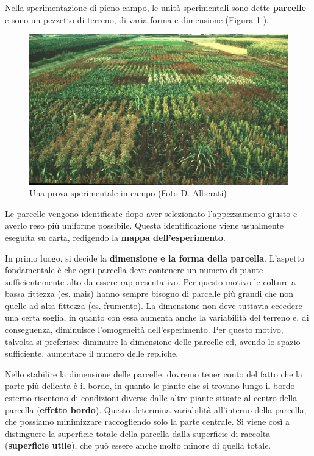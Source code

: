 \documentclass[a4paper,12pt,oneside]{book}
\begin{document}
Nella sperimentazione di pieno campo, le unità sperimentali sono dette \textbf{parcelle} e sono un pezzetto di terreno, di varia forma e dimensione (Figura \ref{fig:figName21} ).

\begin{figure}

{\centering \includegraphics[width=0.9\linewidth]{_images/SorgoProveVarietali} 

}

\caption{Una prova sperimentale in campo (Foto D. Alberati)}\label{fig:figName21}
\end{figure}

Le parcelle vengono identificate dopo aver selezionato l'appezzamento giusto e averlo reso più uniforme possibile. Questa identificazione viene usualmente eseguita su carta, redigendo la \textbf{mappa dell'esperimento}.

In primo luogo, si decide la \textbf{dimensione e la forma della parcella}. L'aspetto fondamentale è che ogni parcella deve contenere un numero di piante sufficientemente alto da essere rappresentativo. Per questo motivo le colture a bassa fittezza (es. mais) hanno sempre bisogno di parcelle più grandi che non quelle ad alta fittezza (es. frumento). La dimensione non deve tuttavia eccedere una certa soglia, in quanto con essa aumenta anche la variabilità del terreno e, di conseguenza, diminuisce l'omogeneità dell'esperimento. Per questo motivo, talvolta si preferisce diminuire la dimensione delle parcelle ed, avendo lo spazio sufficiente, aumentare il numero delle repliche.

Nello stabilire la dimensione delle parcelle, dovremo tener conto del fatto che la parte più delicata è il bordo, in quanto le piante che si trovano lungo il bordo esterno risentono di condizioni diverse dalle altre piante situate al centro della parcella (\textbf{effetto bordo}). Questo determina variabilità all'interno della parcella, che possiamo minimizzare raccogliendo solo la parte centrale. Si viene così a distinguere la superficie totale della parcella dalla superficie di raccolta (\textbf{superficie utile}), che può essere anche molto minore di quella totale.
\end{document}
